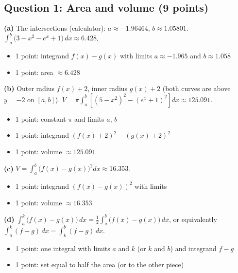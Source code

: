 \documentclass{apcalc}
\begin{document}
\subsection*{Question 1: Area and volume (9 points)}
\textbf{(a)} The intersections (calculator): $a\approx-1.96464$, $b\approx1.05801$. $\int_a^b\big(3-x^2-e^x+1\big)\,dx\approx6.428$.
\begin{itemize}[leftmargin=1.6em,itemsep=0pt]
\item 1 point: integrand $f(x)-g(x)$ with limits $a\approx-1.965$ and $b\approx1.058$
\item 1 point: area $\approx6.428$
\end{itemize}
\textbf{(b)} Outer radius $f(x)+2$, inner radius $g(x)+2$ (both curves are above $y=-2$ on $[a,b]$). $V=\pi\int_a^b\left[(5-x^2)^2-(e^x+1)^2\right]dx\approx125.091$.
\begin{itemize}[leftmargin=1.6em,itemsep=0pt]
\item 1 point: constant $\pi$ and limits $a$, $b$
\item 1 point: integrand $(f(x)+2)^2-(g(x)+2)^2$
\item 1 point: volume $\approx125.091$
\end{itemize}
\textbf{(c)} $V=\int_a^b\big(f(x)-g(x)\big)^2dx\approx16.353$.
\begin{itemize}[leftmargin=1.6em,itemsep=0pt]
\item 1 point: integrand $(f(x)-g(x))^2$ with limits
\item 1 point: volume $\approx16.353$
\end{itemize}
\textbf{(d)} $\int_a^k\big(f(x)-g(x)\big)\,dx=\frac12\int_a^b\big(f(x)-g(x)\big)\,dx$, or equivalently $\int_a^k(f-g)\,dx=\int_k^b(f-g)\,dx$.
\begin{itemize}[leftmargin=1.6em,itemsep=0pt]
\item 1 point: one integral with limits $a$ and $k$ (or $k$ and $b$) and integrand $f-g$
\item 1 point: set equal to half the area (or to the other piece)
\end{itemize}
\end{document}
